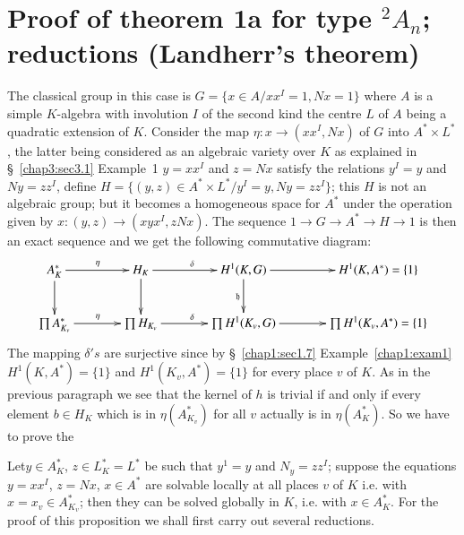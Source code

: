 \section[Proof of theorem 1a for type...]{Proof of theorem 1a for type ${}^2A_n$; reductions
  (Landherr's theorem)}\label{chap5:sec5.5}

 The classical group in this case is $G=\bigg\{x \in A /xx^{I}=1,Nx=1
 \bigg\}$ where $A$ is a simple $K$-algebra with involution $I$ of the
 second kind the centre 
  $L$ of $A$ being a quadratic extension of $K$. Consider the map
  $\eta : x \rightarrow (xx^{I}, Nx)$ of $G$ into $A^* \times L^*$,
  the latter being considered as an algebraic variety over $K$ as
  explained in \S~\ref{chap3:sec3.1} Example~1
  $y=xx^{I}$ and $z=Nx$ satisfy 
  the relations $y^I=y$ and $Ny=zz^{I}$, define $H=\bigg\{ (y,z)\in
  A^* \times L^* \bigg / y^I=y, Ny=zz^{I}\bigg\}$; this $H$ is not an
  algebraic group; but it becomes a homogeneous space for $A^*$ under
  the operation given by $x:(y,z) \rightarrow(xyx^{I}, zNx)$. The
  sequence $1 \rightarrow G \rightarrow A^{*} \rightarrow H
  \rightarrow 1$ is then an exact sequence and we get the following
  commutative diagram: 
{\fontsize{9}{11}\selectfont
\[
\xymatrix@C=1.3cm{
A^\ast_K \ar[r]^{\eta}\ar[d] & H_K \ar[r]^{\delta}\ar[d] & H^1 (K,G)
\ar[r] \ar[d]_{\mathfrak{h}} & H^1 (K, A^\ast) = \{1\}\\
\prod A^\ast_{K_v} \ar[r]^\eta & \prod H_{K_v} \ar[r]^{\delta} & \prod
H^1 (K_v, G) \ar[r] & \prod H^1 (K_v, A^\ast) = \{1\}
}
\]}
 The mapping $\delta's$ are surjective since by 
\S~\ref{chap1:sec1.7} Example~\ref{chap1:exam1} 
 $H^1(K,A^*)= \{1\}$ and $H^1(K_v, A^*) = \{1\}$ for every place $v$ of
 $K$. As in the previous paragraph we see that the kernel of $h$ is
 trivial if and only if every element $b \in H_K$ which is in
 $\eta(A^*_{K_v})$ for all $v$ actually is in $\eta(A^*_K)$. So we
 have to prove the       
 
\setcounter{proposition}{0}
\begin{proposition}\label{chap5:prop1}%
Let\pageoriginale $y \in A^*_K$, $z \in L^*_K=L^*$ be such that $y^1=y$ and
$N_y=zz^I$; suppose the equations $y=xx^I$, $z = Nx$, $x \in A^*$ are
solvable locally at all places $v$ of $K$ i.e. with $x=x_v \in
A^*_{K_v}$; then they can be solved globally in $K$, i.e. with $x \in
A^*_K$. For the proof of this proposition we shall first carry out
several reductions. 
\end{proposition}

